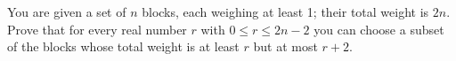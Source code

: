 You are given a set of $n$ blocks, each weighing at least 1; their total weight is $2n$. Prove that for every real number $r$ with $0 \leq r \leq 2n - 2$ you can choose a subset of the blocks whose total weight is at least $r$ but at most $r + 2$.
